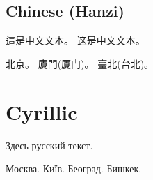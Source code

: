 \documentclass[a4paper]{ujarticle}
\begin{document}
\subsection{Chinese (Hanzi)}
\begin{otherlanguage}{tchinese}
這是中文文本。
\foreignlanguage{schinese}{这是中文文本。}

北京。
廈門\foreignlanguage{schinese}{(厦门)}。
臺北\foreignlanguage{schinese}{(台北)}。
\end{otherlanguage}

\section{Cyrillic}
\selectfont
Здесь русский текст.

Москва.
Київ.
Београд.
Бишкек.

\selectfont

\printindex
\end{document}
